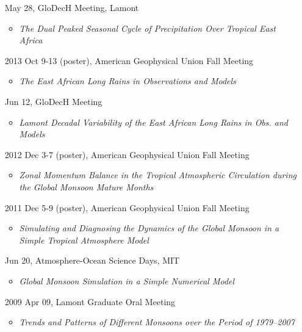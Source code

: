 \documentclass[11pt]{article}
\newcommand{\meetingName}[1]{#1}
\newcommand{\ptitle}[1]{\textit{#1}}
\begin{document}
\begin{itemize}[leftmargin=10ex, itemsep=1ex]
	\item[\phantom{2014}]May 28,  \meetingName{ GloDecH Meeting}, Lamont
	\begin{itemize}[leftmargin=4ex]
		\item \ptitle{The Dual Peaked Seasonal Cycle of Precipitation Over Tropical East Africa}
		\end{itemize}
	
	\item[2013] Oct 9-13 (poster), \meetingName{American Geophysical Union Fall Meeting}
	\begin{itemize}[leftmargin=4ex]
		\item \ptitle{The East African Long Rains in Observations and Models}
		\end{itemize}
	
	\item [\phantom{2013}] Jun 12, \meetingName{GloDecH Meeting}
	\begin{itemize}[leftmargin=4ex]
		\item \ptitle{Lamont Decadal Variability of the East African Long Rains in Obs. and Models}
		\end{itemize}
			
	\item [2012] Dec 3-7 (poster), \meetingName{American Geophysical Union Fall Meeting}
	\begin{itemize}[leftmargin=4ex]
		\item \ptitle{Zonal Momentum Balance in the Tropical Atmospheric Circulation during the Global Monsoon Mature Months}
		\end{itemize}
	
	\item [2011] Dec 5-9 (poster), \meetingName{American Geophysical Union Fall Meeting}
	\begin{itemize}[leftmargin=4ex]
		\item \ptitle{Simulating and Diagnosing the Dynamics of the Global Monsoon in a Simple Tropical Atmosphere Model}
		\end{itemize} 
	 
	\item [\phantom{2011}] Jun 20, \meetingName{Atmosphere-Ocean Science Days}, MIT
	\begin{itemize}[leftmargin=4ex]
		\item \ptitle{Global Monsoon Simulation in a Simple Numerical Model}
		\end{itemize}
	
	\item [2009] Apr 09, \meetingName{Lamont Graduate Oral Meeting}
	\begin{itemize}[leftmargin=4ex]
		\item \ptitle{Trends and Patterns of Different Monsoons over the Period of 1979--2007}
		\end{itemize}
	

\end{itemize}
\end{document}
